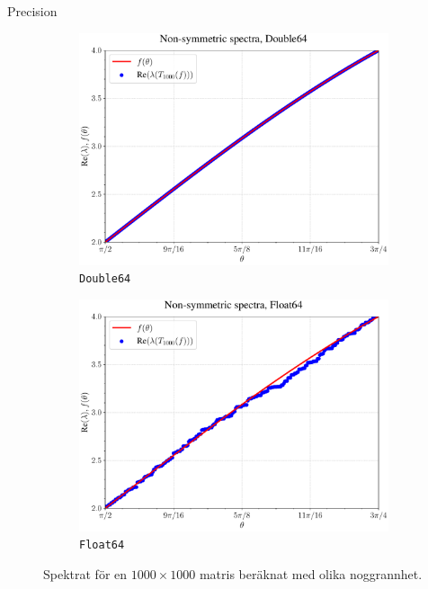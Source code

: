 \documentclass{beamer}
\begin{document}
\begin{frame}{Precision}
\begin{figure}[H]
    \centering
    \begin{subfigure}{0.49\textwidth}
        \includegraphics[width=\textwidth]{images/unstableeigDouble.pdf}
        \caption{\texttt{Double64}}
        \label{fig:per_bi_lap_sym}
    \end{subfigure}
    \hfill
    \begin{subfigure}{0.49\textwidth}
        \includegraphics[width=\textwidth]{images/unstableeig.pdf}
        \caption{\texttt{Float64}}
        \label{fig:eigval_per_bilap}
    \end{subfigure}
    \caption{Spektrat för en $1000\times1000$ matris beräknat med olika noggrannhet.}
    \label{fig:Spectrum Laplace & perturbed}
    \end{figure}
\end{frame}
\end{document}
